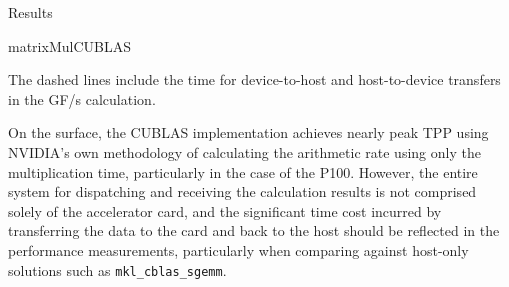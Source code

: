 \documentclass{article}
\begin{document}
\begin{section}{Results}
\begin{subsection}{matrixMulCUBLAS}
\begin{paragraph}{}
      The dashed lines include the time for device-to-host and host-to-device transfers in the GF/s calculation.
    \end{paragraph}
    \begin{paragraph}{}
    \end{paragraph}
    \begin{paragraph}{}
      On the surface, the CUBLAS implementation achieves nearly peak TPP using NVIDIA's own methodology of calculating the arithmetic rate
      using only the multiplication time, particularly in the case of the P100. However, the entire system for dispatching and receiving
      the calculation results is not comprised solely of the accelerator card, and the significant time cost incurred by transferring the
      data to the card and back to the host should be reflected in the performance measurements, particularly when comparing against host-only
      solutions such as \texttt{mkl\_cblas\_sgemm}.
    \end{paragraph}
  \end{subsection}


\end{section}
\end{document}
